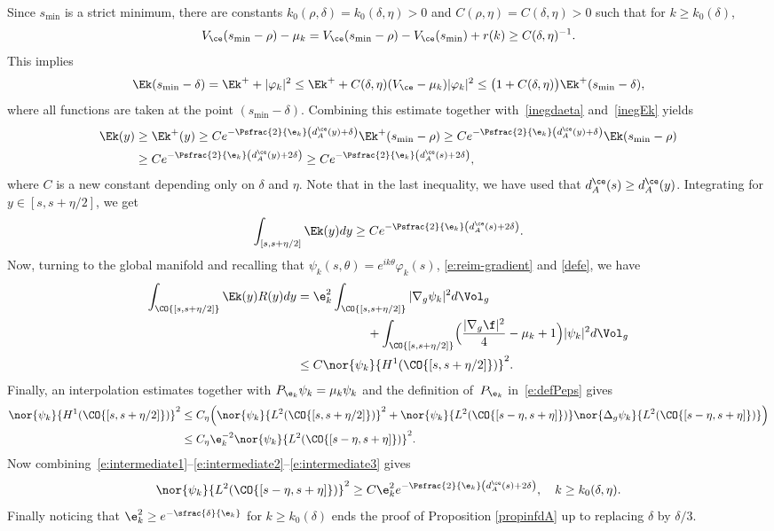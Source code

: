 Since $s_{\min}$ is a strict minimum, there are constants $k_0(\rho,\delta)= k_0(\delta,\eta)>0$ and $C(\rho,\eta) = C(\delta,\eta)>0$ such that for $k\geq k_0(\delta)$,
\[
V_{\ce}(s_{\min}-\rho)-\mu_k = V_{\ce}(s_{\min}-\rho)-V_{\ce}(s_{\min}) + r(k) \geq C(\delta,\eta)^{-1}.
\]
This implies
\[
\Ek(s_{\min}-\delta)= \Ek^+ + |\varphi_k|^2 \leq \Ek^+ + C(\delta,\eta)(V_{\ce}-\mu_k) |\varphi_k|^2 \leq \big( 1+C(\delta,\eta) \big) \Ek^+(s_{\min}-\delta),
\]
where all functions are taken at the point $(s_{\min}-\delta)$.
Combining this estimate together with~\eqref{inegdaeta} and~\eqref{inegEk} yields
\begin{align*}
\Ek(y) &\geq \Ek^+(y)\geq C e^{-\Psfrac{2}{\e_k}\left(d_A^{\ce}(y)+\delta\right)} \Ek^+(s_{\min}-\rho)
\geq C e^{-\Psfrac{2}{\e_k}\left(d_A^{\ce}(y)+\delta\right)} \Ek (s_{\min}-\rho) \\
& \geq C e^{-\Psfrac{2}{\e_k}\left(d_A^{\ce}(y)+2\delta\right)}
\geq C e^{-\Psfrac{2}{\e_k}\left(d_A^{\ce}(s)+2\delta\right)},
\end{align*}
where $C$ is a new constant depending only on $\delta$ and $\eta$. Note that in the last inequality, we have used that $d_A^{\ce}(s)\geq d_A^{\ce}(y)$. Integrating for $y\in [s,s+\eta/2]$, we get
\begin{equation}
\label{e:intermediate1}
\int_{[s,s+\eta/2]} \Ek(y)dy\geq Ce^{-\Psfrac{2}{\e_k}\left(d_A^{\ce}(s)+2\delta\right)}.
\end{equation}
Now, turning to the global manifold and recalling that $\psi_k(s,\theta)=e^{ik\theta}\varphi_k(s)$, \eqref{e:reim-gradient} and \eqref{defe}, we have
\begin{align}
\label{e:intermediate2}
\int_{\CO{[s,s+\eta/2]}} \Ek(y)R(y)dy & = \e_k^2\int_{\CO{[s,s+\eta/2]}} |\nabla_g \psi_k|^2 d\Vol_g \nonumber \\
& \hspace*{2cm}+ \int_{\CO{[s,s+\eta/2]}}\Bigl(\frac{ |\nabla_g \f|^2}{4}-\mu_k +1\Bigr)|\psi_k|^2 d\Vol_g \nonumber \\
& \leq C \nor{\psi_k}{H^1(\CO{[s,s+\eta/2]})}^2.
\end{align}
Finally, an interpolation estimates together with $P_{\e_k} \psi_k = \mu_k \psi_k$ and the definition of~$P_{\e_k}$ in~\eqref{e:defPeps} gives
\begin{align}
\label{e:intermediate3}
\nor{\psi_k}{H^1(\CO{[s,s+\eta/2]})}^2 & \leq C_{\eta}\Bigl(\nor{\psi_k}{L^2(\CO{[s,s+\eta/2]})}^2+ \nor{\psi_k}{L^2(\CO{[s-\eta,s+\eta]})}\nor{\Delta_g\psi_k}{L^2(\CO{[s-\eta,s+\eta]})}\Bigr) \nonumber \\
& \leq C_{\eta} \e_k^{-2}\nor{\psi_k}{L^2(\CO{[s-\eta,s+\eta]})}^2.
\end{align}
Now combining~\eqref{e:intermediate1}--\eqref{e:intermediate2}--\eqref{e:intermediate3} gives
\[
\nor{\psi_k}{L^2(\CO{[s-\eta,s+\eta]})}^2\geq C\e_k^{2} e^{-\Psfrac{2}{\e_k}\left(d_A^{\ce}(s)+2\delta\right)},\quad k \geq k_0(\delta, \eta).
\]
Finally noticing that $\e_k^{2}\geq e^{-\sfrac{\delta}{\e_k}}$ for $k\geq k_0(\delta)$ ends the proof of Proposition \ref{propinfdA} up to replacing $\delta$ by $\delta/3$.
\enp

